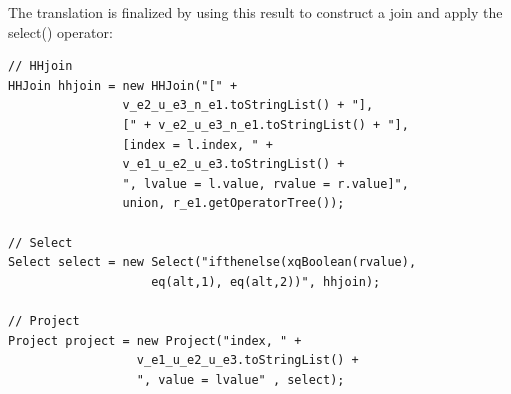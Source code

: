 The translation is finalized by using this result to construct a join and apply
the \textsf{select()} operator:

\begin{Verbatim}
// HHjoin
HHJoin hhjoin = new HHJoin("[" + 
                v_e2_u_e3_n_e1.toStringList() + "],
                [" + v_e2_u_e3_n_e1.toStringList() + "], 
                [index = l.index, " + 
                v_e1_u_e2_u_e3.toStringList() +
                ", lvalue = l.value, rvalue = r.value]", 
                union, r_e1.getOperatorTree());

// Select
Select select = new Select("ifthenelse(xqBoolean(rvalue), 
                    eq(alt,1), eq(alt,2))", hhjoin);

// Project
Project project = new Project("index, " + 
                  v_e1_u_e2_u_e3.toStringList() +
                  ", value = lvalue" , select);
\end{Verbatim}
